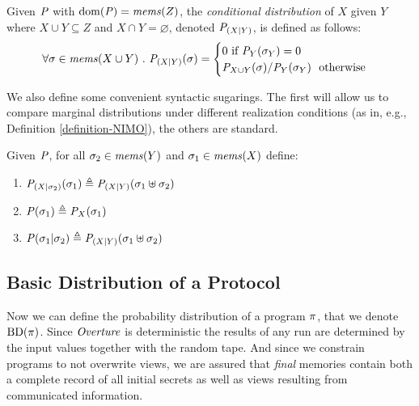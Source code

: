 \begin{definition}
  Given $\mathit{P}$ with $\mathrm{dom}(\mathit{P}) = \mathit{mems}(Z)$, the \emph{conditional distribution}
  of $X$ given $Y$ where $X \cup Y \subseteq Z$ and $X \cap Y = \varnothing$, denoted $\mathit{P}_{({X}|{Y})}$,
  is defined as follows:
  $$
  \forall \store \in \mems(X \cup Y)\ .\ 
  \condd{\pmf}{X}{Y}(\store) =
  \begin{cases}
    0 \text{\ if\ } \margd{\pmf}{Y}(\store_Y) = 0\\
    \margd{\pmf}{X \cup Y}(\store) / \margd{\pmf}{Y}(\store_Y)\ \text{\ otherwise}
  \end{cases}
  $$
\end{definition}
We also define some convenient syntactic sugarings. The first will allow us to
compare marginal distributions under different realization conditions
(as in, e.g., Definition \ref{definition-NIMO}), the others are standard.
\begin{definition}
  Given $\mathit{P}$, for all $\sigma_2 \in \mathit{mems}(Y)$ and $\sigma_1 \in \mathit{mems}(X)$ define:
  \begin{enumerate}
  \item $\mathit{P}_{({X}|{\sigma_2})}(\sigma_1) \triangleq \mathit{P}_{({X}|{Y})}(\sigma_1 \uplus \sigma_2)$
  \item $\mathit{P}(\sigma_1)  \triangleq {\mathit{P}}_{X}(\sigma_1)$ 
  \item $\mathit{P}(\sigma_1|\sigma_2) \triangleq \mathit{P}_{({X}|{Y})}(\sigma_1 \uplus \sigma_2)$
  \end{enumerate}
\end{definition}

\subsection{Basic Distribution of a Protocol}
Now we can define the probability distribution of a program $\pi$,
that we denote $\mathrm{BD}(\pi)$. Since $\mathit{Overture}$ is deterministic the
results of any run are determined by the input values together with
the random tape. And since we constrain programs to not overwrite
views, we are assured that \emph{final} memories contain both a
complete record of all initial secrets as well as views resulting from
communicated information. 

